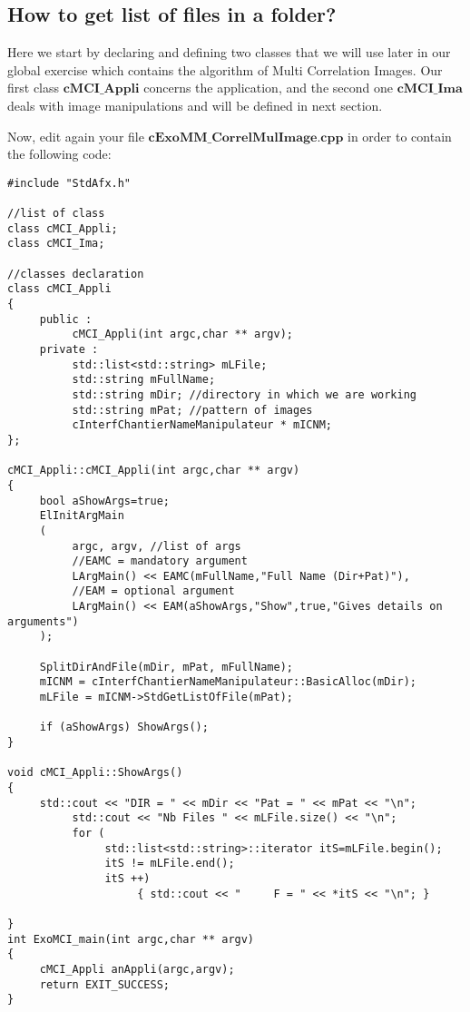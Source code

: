 \subsection{How to get list of files in a folder?}
Here we start by declaring and defining two classes that we will use later in our global exercise which contains the algorithm of Multi Correlation Images. Our first class $\textbf{cMCI\_Appli}$ concerns the application, and the second one $\textbf{cMCI\_Ima}$ deals with image manipulations and will be defined in next section. \newline

Now, edit again your file $\textbf{cExoMM\_CorrelMulImage.cpp}$ in order to contain the following code:

\begin{verbatim}
#include "StdAfx.h"

//list of class
class cMCI_Appli;
class cMCI_Ima;

//classes declaration
class cMCI_Appli
{
     public :
          cMCI_Appli(int argc,char ** argv);
     private :
          std::list<std::string> mLFile;
          std::string mFullName;
          std::string mDir; //directory in which we are working
          std::string mPat; //pattern of images
          cInterfChantierNameManipulateur * mICNM;
};

cMCI_Appli::cMCI_Appli(int argc,char ** argv)
{
     bool aShowArgs=true;
     ElInitArgMain
     (
          argc, argv, //list of args
          //EAMC = mandatory argument
          LArgMain() << EAMC(mFullName,"Full Name (Dir+Pat)"),
          //EAM = optional argument
          LArgMain() << EAM(aShowArgs,"Show",true,"Gives details on arguments")
     );

     SplitDirAndFile(mDir, mPat, mFullName);
     mICNM = cInterfChantierNameManipulateur::BasicAlloc(mDir);
     mLFile = mICNM->StdGetListOfFile(mPat);

     if (aShowArgs) ShowArgs();
}

void cMCI_Appli::ShowArgs()
{
     std::cout << "DIR = " << mDir << "Pat = " << mPat << "\n";
          std::cout << "Nb Files " << mLFile.size() << "\n";
          for (
               std::list<std::string>::iterator itS=mLFile.begin();
               itS != mLFile.end();
               itS ++)
                    { std::cout << "     F = " << *itS << "\n"; }

}
int ExoMCI_main(int argc,char ** argv)
{
     cMCI_Appli anAppli(argc,argv);
     return EXIT_SUCCESS;
}
\end{verbatim}

